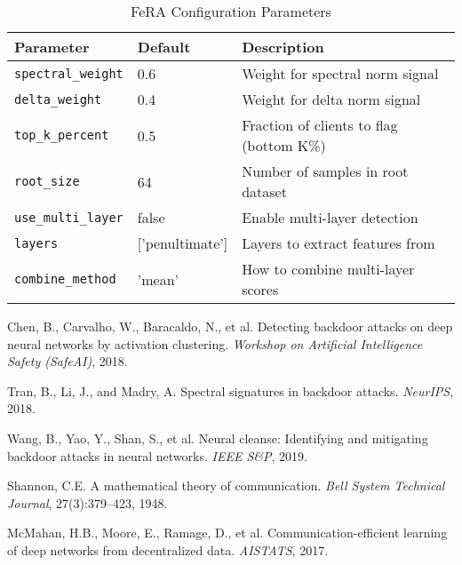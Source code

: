 \documentclass[11pt,a4paper]{article}
\begin{document}
\begin{table}[h]
\centering
\begin{tabular}{@{}llp{6cm}@{}}
\toprule
\textbf{Parameter} & \textbf{Default} & \textbf{Description} \\
\midrule
\texttt{spectral\_weight} & 0.6 & Weight for spectral norm signal \\
\texttt{delta\_weight} & 0.4 & Weight for delta norm signal \\
\texttt{top\_k\_percent} & 0.5 & Fraction of clients to flag (bottom K\%) \\
\texttt{root\_size} & 64 & Number of samples in root dataset \\
\texttt{use\_multi\_layer} & false & Enable multi-layer detection \\
\texttt{layers} & ['penultimate'] & Layers to extract features from \\
\texttt{combine\_method} & 'mean' & How to combine multi-layer scores \\
\bottomrule
\end{tabular}
\caption{FeRA Configuration Parameters}
\end{table}


\begin{thebibliography}{9}

Chen, B., Carvalho, W., Baracaldo, N., et al.
\newblock Detecting backdoor attacks on deep neural networks by activation clustering.
\newblock \emph{Workshop on Artificial Intelligence Safety (SafeAI)}, 2018.

Tran, B., Li, J., and Madry, A.
\newblock Spectral signatures in backdoor attacks.
\newblock \emph{NeurIPS}, 2018.

Wang, B., Yao, Y., Shan, S., et al.
\newblock Neural cleanse: Identifying and mitigating backdoor attacks in neural networks.
\newblock \emph{IEEE S\&P}, 2019.

Shannon, C.E.
\newblock A mathematical theory of communication.
\newblock \emph{Bell System Technical Journal}, 27(3):379--423, 1948.

McMahan, H.B., Moore, E., Ramage, D., et al.
\newblock Communication-efficient learning of deep networks from decentralized data.
\newblock \emph{AISTATS}, 2017.

\end{thebibliography}
\end{document}

